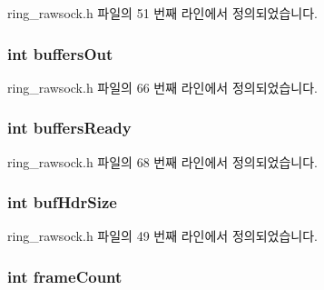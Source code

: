 ring\+\_\+rawsock.\+h 파일의 51 번째 라인에서 정의되었습니다.

\subsubsection[{\texorpdfstring{buffers\+Out}{buffersOut}}]{\setlength{\rightskip}{0pt plus 5cm}int buffers\+Out}\hypertarget{structring__rawsock__t_aeda5b51f8dc77d9f2012426b2e4d87aa}{}\label{structring__rawsock__t_aeda5b51f8dc77d9f2012426b2e4d87aa}


ring\+\_\+rawsock.\+h 파일의 66 번째 라인에서 정의되었습니다.

\subsubsection[{\texorpdfstring{buffers\+Ready}{buffersReady}}]{\setlength{\rightskip}{0pt plus 5cm}int buffers\+Ready}\hypertarget{structring__rawsock__t_a06dd59c797f7aa0ca9f888304888f2a0}{}\label{structring__rawsock__t_a06dd59c797f7aa0ca9f888304888f2a0}


ring\+\_\+rawsock.\+h 파일의 68 번째 라인에서 정의되었습니다.

\subsubsection[{\texorpdfstring{buf\+Hdr\+Size}{bufHdrSize}}]{\setlength{\rightskip}{0pt plus 5cm}int buf\+Hdr\+Size}\hypertarget{structring__rawsock__t_ac19f434244a282fa75ce90a0db4052c1}{}\label{structring__rawsock__t_ac19f434244a282fa75ce90a0db4052c1}


ring\+\_\+rawsock.\+h 파일의 49 번째 라인에서 정의되었습니다.

\subsubsection[{\texorpdfstring{frame\+Count}{frameCount}}]{\setlength{\rightskip}{0pt plus 5cm}int frame\+Count}\hypertarget{structring__rawsock__t_abaf7d77bd2fc7eb6125fa605bd645b67}{}\label{structring__rawsock__t_abaf7d77bd2fc7eb6125fa605bd645b67}


